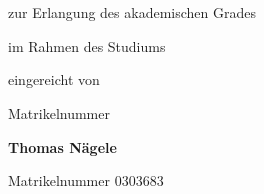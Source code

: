 \begin{center}
{\ \vspace{3.4cm}}

\begin{minipage}[t][2.8cm][t]{\textwidth}%
\begin{center}
{\thesistitlefontHUGE\sffamily\bfseries\tuinfthesistitle}\\
\bigskip
{\thesistitlefonthuge\sffamily\bfseries\tuinfthesissubtitle}
\end{center}
\end{minipage}


\vspace{1.3cm}

{\thesistitlefontLARGE\sffamily \tuinfthesistype}

\vspace{6mm}

{\thesistitlefontlarge\sffamily zur Erlangung des akademischen Grades}

\vspace{6mm}

{\thesistitlefontLARGE\sffamily\bfseries \tuinfthesisdegree}

\vspace{6mm}

{\thesistitlefontlarge\sffamily im Rahmen des Studiums}

\vspace{6mm}

{\thesistitlefontLarge\sffamily\bfseries \tuinfthesiscurriculum}

\vspace{6.5mm}

{\thesistitlefontlarge\sffamily eingereicht von}

\vspace{6mm}

{\thesistitlefontLarge\sffamily\bfseries \tuinfthesisauthor}

\vspace{1.5mm}

{\thesistitlefontlarge\sffamily Matrikelnummer \tuinfthesismatrikelno} 

\vspace{6mm}

{\thesistitlefontLarge\sffamily\bfseries Thomas N{\"a}gele}

\vspace{1.5mm}

{\thesistitlefontlarge\sffamily Matrikelnummer 0303683}

\vspace{0.75cm}


\end{center}
